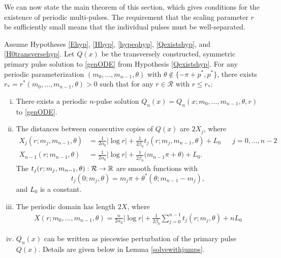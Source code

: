 \documentclass[thesis.tex]{subfiles}
\begin{document}
We can now state the main theorem of this section, which gives conditions for the existence of periodic multi-pulses. The requirement that the scaling parameter $r$ be sufficiently small means that the individual pulses must be well-separated. 

\begin{theorem}\label{perexist}
Assume Hypotheses \ref{Ehyp}, \ref{Hhyp}, \ref{hypeqhyp}, \ref{Qexistshyp}, and \ref{H0transversehyp}. Let $Q(x)$ be the transversely constructed, symmetric primary pulse solution to \eqref{genODE} from Hypothesis \ref{Qexistshyp}. For any periodic parameterization $(m_0, \dots, m_{n-1}, \theta)$ with $\theta \notin \{-\pi + p^*, p^* \}$, there exists $r_* = r^*(m_0, \dots, m_{n-1}, \theta) > 0$ such that for any $r \in \mathcal{R}$ with $r \leq r_*$:
\begin{enumerate}[(i)]
	\item There exists a periodic $n$-pulse solution $Q_n(x) = Q_n(x; m_0, \dots, m_{n-1}, \theta, r)$ to \eqref{genODE}.

	\item The distances between consecutive copies of $Q(x)$ are $2X_j$, where
	\begin{align}\label{Xj}
		X_j(r; m_j, m_{n-1},\theta) &= \frac{1}{2 \alpha_0} |\log r| + \frac{1}{2\beta_0} t_j(r; m_j,m_{n-1}, \theta) + L_0 && j = 0, \dots, n-2 \\
		X_{n-1}(r; m_{n-1}, \theta) &= \frac{1}{2 \alpha_0} |\log r| + \frac{1}{2 \beta_0}\big( m_{n-1}\pi + \theta \big) + L_0.
	\end{align}
	The $t_j(r; m_j, m_{n-1}, \theta): \mathcal{R} \rightarrow \mathbb{R}$ are smooth functions with 
	\[
	t_j(0; m_j, \theta) = m_j \pi + \theta^*(\theta; m_{n-1} - m_j),
	\]
	and $L_0$ is a constant.

	\item The periodic domain has length $2X$, where
	\begin{align}\label{Xdomain}
	X(r; m_0, \dots, m_{n-1}, \theta) = \frac{n}{2\alpha_0} |\log r| + \frac{1}{2\beta_0} \sum_{j=0}^{n-1} t_j(r; m_j, \theta) + n L_0
	\end{align}

	\item $Q_n(x)$ can be written as piecewise perturbation of the primary pulse $Q(x)$. Details are given below in Lemma \ref{solvewithjumps}.
\end{enumerate}
\end{theorem}
\end{document}
